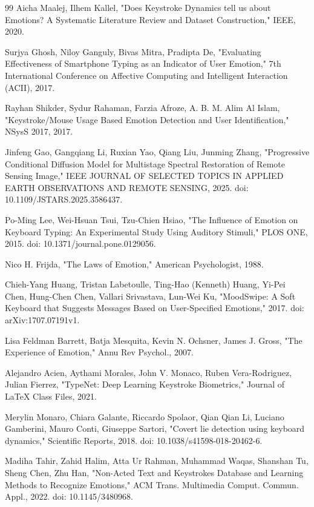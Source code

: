 \documentclass[conference]{IEEEtran}
\begin{document}
\begin{thebibliography}{99}
Aicha Maalej, Ilhem Kallel, "Does Keystroke Dynamics tell us about Emotions? A Systematic Literature Review and Dataset Construction," IEEE, 2020.

Surjya Ghosh, Niloy Ganguly, Bivas Mitra, Pradipta De, "Evaluating Effectiveness of Smartphone Typing as an Indicator of User Emotion," 7th International Conference on Affective Computing and Intelligent Interaction (ACII), 2017.

Rayhan Shikder, Sydur Rahaman, Farzia Afroze, A. B. M. Alim Al Islam, "Keystroke/Mouse Usage Based Emotion Detection and User Identification," NSysS 2017, 2017.

Jinfeng Gao, Gangqiang Li, Ruxian Yao, Qiang Liu, Junming Zhang, "Progressive Conditional Diffusion Model for Multistage Spectral Restoration of Remote Sensing Image," IEEE JOURNAL OF SELECTED TOPICS IN APPLIED EARTH OBSERVATIONS AND REMOTE SENSING, 2025. doi: 10.1109/JSTARS.2025.3586437.

Po-Ming Lee, Wei-Hsuan Tsui, Tzu-Chien Hsiao, "The Influence of Emotion on Keyboard Typing: An Experimental Study Using Auditory Stimuli," PLOS ONE, 2015. doi: 10.1371/journal.pone.0129056.

Nico H. Frijda, "The Laws of Emotion," American Psychologist, 1988.

Chieh-Yang Huang, Tristan Labetoulle, Ting-Hao (Kenneth) Huang, Yi-Pei Chen, Hung-Chen Chen, Vallari Srivastava, Lun-Wei Ku, "MoodSwipe: A Soft Keyboard that Suggests Messages Based on User-Specified Emotions," 2017. doi: arXiv:1707.07191v1.

Lisa Feldman Barrett, Batja Mesquita, Kevin N. Ochsner, James J. Gross, "The Experience of Emotion," Annu Rev Psychol., 2007.

Alejandro Acien, Aythami Morales, John V. Monaco, Ruben Vera-Rodriguez, Julian Fierrez, "TypeNet: Deep Learning Keystroke Biometrics," Journal of LaTeX Class Files, 2021.

Merylin Monaro, Chiara Galante, Riccardo Spolaor, Qian Qian Li, Luciano Gamberini, Mauro Conti, Giuseppe Sartori, "Covert lie detection using keyboard dynamics," Scientific Reports, 2018. doi: 10.1038/s41598-018-20462-6.

Madiha Tahir, Zahid Halim, Atta Ur Rahman, Muhammad Waqas, Shanshan Tu, Sheng Chen, Zhu Han, "Non-Acted Text and Keystrokes Database and Learning Methods to Recognize Emotions," ACM Trans. Multimedia Comput. Commun. Appl., 2022. doi: 10.1145/3480968.


\end{thebibliography}
\end{document}
